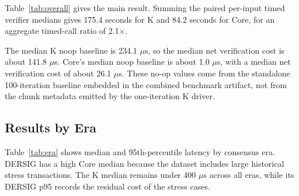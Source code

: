 \documentclass[conference]{IEEEtran}
\begin{document}
Table~\ref{tab:overall} gives the main result.  Summing the paired per-input
timed verifier medians gives 175.4 seconds for K and 84.2 seconds for Core, for
an aggregate timed-call ratio of 2.1$\times$.

\begin{table}[htbp]
  \caption{Fresh merged-main benchmark, paired rows}
  \label{tab:overall}
  \centering
  \footnotesize
\end{table}

The median K noop baseline is 234.1 $\mu$s, so the median net verification
cost is about 141.8 $\mu$s.  Core's median noop baseline is about 1.0 $\mu$s,
with a median net verification cost of about 26.1 $\mu$s.  These no-op values
come from the standalone 100-iteration baseline embedded in the combined
benchmark artifact, not from the chunk metadata emitted by the one-iteration K
driver.

\subsection{Results by Era}

Table~\ref{tab:era} shows median and 95th-percentile latency by consensus era.
DERSIG has a high Core median because the dataset includes large historical
stress transactions.  The K median remains under 400 $\mu$s across all eras,
while its DERSIG p95 records the residual cost of the stress cases.

\begin{table}[htbp]
  \caption{Latency by consensus era}
  \label{tab:era}
  \centering
  \footnotesize
\end{table}
\end{document}
